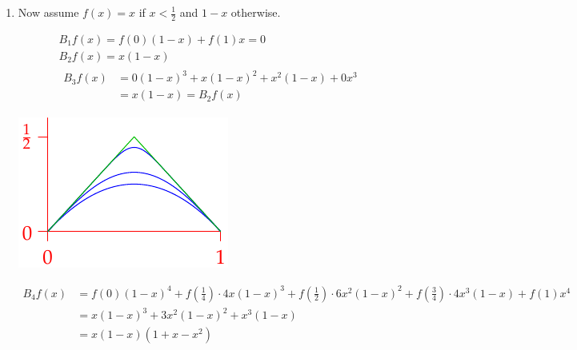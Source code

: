 \begin{examples}{}{}
\begin{enumerate}
  
  \item Now assume $f(x)=x$ if $x<\frac 12$ and $1-x$ otherwise.\smallbreak
   	\begin{minipage}[t]{0.6\linewidth}\vspace{-20pt}
		\begin{gather*}
  	B_1f(x)=f(0)(1-x)+f(1)x=0\\[5pt]
  	B_2f(x)=x(1-x)\\[5pt]
  	\begin{aligned}
  	B_3f(x)&=0(1-x)^3+x(1-x)^2+x^2(1-x)+0x^3\\
  	&=x(1-x)=B_2f(x)
		\end{aligned}
  	\end{gather*}
	\end{minipage}\begin{minipage}[t]{0.4\linewidth}\vspace{-25pt}
		\flushright\includegraphics[scale=1]{bernstein2}
	\end{minipage}\vspace{-5pt}
  	\begin{align*}
  	B_4f(x)&=f(0)(1-x)^4+f(\tfrac 14)\!\cdot\! 4x(1-x)^3+f(\tfrac 12)\!\cdot\! 6x^2(1-x)^2 +f(\tfrac 34)\!\cdot\! 4x^3(1-x)+f(1)x^4\\
  	&=x(1-x)^3+3x^2(1-x)^2 +x^3(1-x)\\
  	&=x(1-x)(1+x-x^2)
		\end{align*}
\end{enumerate}
\end{examples}

\clearpage

\def\ray#1{\overrightarrow{#1}}


